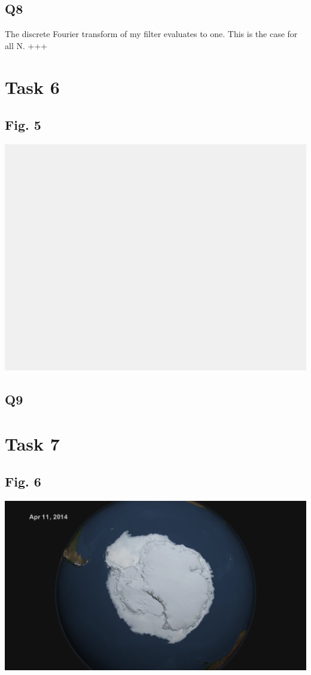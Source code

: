 \documentclass[11pt]{article}
\begin{document}
\subsection*{Q8}
The discrete Fourier transform of my filter evaluates to one. This is the case for all N. +++

\section*{Task 6}
\subsection*{Fig. 5}
\includegraphics[width=\textwidth]{reportImages/figure5}

\subsection*{Q9}


\section*{Task 7}
\subsection*{Fig. 6}
\includegraphics[width=\textwidth]{reportImages/figure6}
\end{document}
